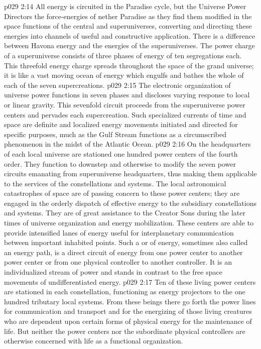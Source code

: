 \vs p029 2:14 All energy is circuited in the Paradise cycle, but the Universe Power Directors  the force\hyp{}energies of nether Paradise as they find them modified in the space functions of the central and superuniverses, converting and directing these energies into channels of useful and constructive application. There is a difference between Havona energy and the energies of the superuniverses. The power charge of a superuniverse consists of three phases of energy of ten segregations each. This threefold energy charge spreads throughout the space of the grand universe; it is like a vast moving ocean of energy which engulfs and bathes the whole of each of the seven supercreations.
\vs p029 2:15 The electronic organization of universe power functions in seven phases and discloses varying response to local or linear gravity. This sevenfold circuit proceeds from the superuniverse power centers and pervades each supercreation. Such specialized currents of time and space are definite and localized energy movements initiated and directed for specific purposes, much as the Gulf Stream functions as a circumscribed phenomenon in the midst of the Atlantic Ocean.
\pc \vs p029 2:16 \bibnobreakspace {} On the headquarters of each local universe are stationed one hundred power centers of the fourth order. They function to downstep and otherwise to modify the seven power circuits emanating from superuniverse headquarters, thus making them applicable to the services of the constellations and systems. The local astronomical catastrophes of space are of passing concern to these power centers; they are engaged in the orderly dispatch of effective energy to the subsidiary constellations and systems. They are of great assistance to the Creator Sons during the later times of universe organization and energy mobilization. These centers are able to provide intensified lanes of energy useful for interplanetary communication between important inhabited points. Such a  or  of energy, sometimes also called an energy path, is a direct circuit of energy from one power center to another power center or from one physical controller to another controller. It is an individualized stream of power and stands in contrast to the free space movements of undifferentiated energy.
\pc \vs p029 2:17 \bibnobreakspace {} Ten of these living power centers are stationed in each constellation, functioning as energy projectors to the one hundred tributary local systems. From these beings there go forth the power lines for communication and transport and for the energizing of those living creatures who are dependent upon certain forms of physical energy for the maintenance of life. But neither the power centers nor the subordinate physical controllers are otherwise concerned with life as a functional organization.
